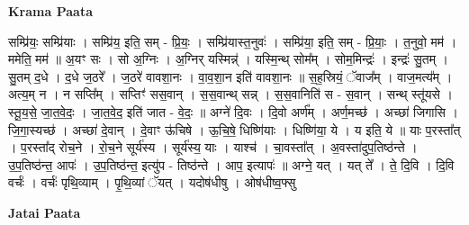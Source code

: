 \documentclass[17pt]{extarticle}
\begin{document}
\textbf{Krama Paata} \newline

सम्प्रि॑यः॒ सम्प्रि॑याः । सम्प्रि॑य॒ इति॒ सम् - प्रि॒यः॒ । सम्प्रि॑यास्त॒नुवः॑ । सम्प्रि॑या॒ इति॒ सम् - प्रि॒याः॒ । त॒नुवो॒ मम॑ । ममेति॒ मम॑ ॥ अ॒यꣳ सः । सो अ॒ग्निः । अ॒ग्निर् यस्मिन्न्॑ । यस्मि॒न्थ् सोम᳚म् । सोम॒मिन्द्रः॑ । इन्द्रः॑ सु॒तम् । सु॒तम् द॒धे । द॒धे ज॒ठरे᳚ । ज॒ठरे॑ वावशा॒नः । वा॒व॒शा॒न इति॑ वावशा॒नः ॥ स॒ह॒स्रियं॒ ॅवाज᳚म् । वाज॒मत्य᳚म् । अत्य॒म् न । न सप्ति᳚म् । सप्तिꣳ॑ सस॒वान् । स॒स॒वान्थ् सन्न् । स॒स॒वानिति॑ स - स॒वान् । सन्थ् स्तू॑यसे । स्तू॒य॒से॒ जा॒त॒वे॒दः॒ । जा॒त॒वे॒द॒ इति॑ जात - वे॒दः॒ ॥ अग्ने॑ दि॒वः । दि॒वो अर्ण᳚म् । अर्ण॒मच्छ॑ । अच्छा॑ जिगासि । जि॒गा॒स्यच्छ॑ । अच्छा॑ दे॒वान् । दे॒वाꣳ ऊ॑चिषे । ऊ॒चि॒षे॒ धिष्णि॑याः । धिष्णि॑या॒ ये । य इति॒ ये ॥ याः प॒रस्ता᳚त् । प॒रस्ता᳚द् रोच॒ने । रो॒च॒ने सूर्य॑स्य । सूर्य॑स्य॒ याः । याश्च॑ । चा॒वस्ता᳚त् । अ॒वस्ता॑दुप॒तिष्ठ॑न्ते । उ॒प॒तिष्ठ॑न्त॒ आपः॑ । उ॒प॒तिष्ठ॑न्त॒ इत्यु॑प - तिष्ठ॑न्ते । आप॒ इत्यापः॑ ॥ अग्ने॒ यत् । यत् ते᳚ । ते॒ दि॒वि । दि॒वि वर्चः॑ । वर्चः॑ पृथि॒व्याम् । पृ॒थि॒व्यां ॅयत् । यदोष॑धीषु । ओष॑धीष्व॒फ्सु \newline

\textbf{Jatai Paata} \newline
\end{document}
